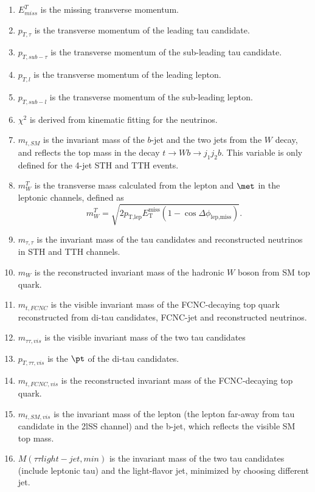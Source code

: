 \begin{enumerate}

\item $E^{T}_{miss}$ is the missing transverse momentum.
\item $p_{T,\tau}$ is the transverse momentum of the leading tau candidate.
\item $p_{T,sub-\tau}$ is the transverse momentum of the sub-leading tau candidate.
\item $p_{T,l}$ is the transverse momentum of the leading lepton.
\item $p_{T,sub-l}$ is the transverse momentum of the sub-leading lepton.
\item $\chi^2$ is derived from kinematic fitting for the neutrinos.
\item $m_{t,SM}$ is the invariant mass of the $b$-jet and the two jets from the $W$ decay, and reflects the top mass in the decay $t\to Wb \to j_1j_2b$. This variable is only defined for the 4-jet STH and TTH events.
\item $m^{T}_{W}$ is the transverse mass calculated from the lepton and $\met$ in the leptonic channels, defined as
\begin{equation}
m^{T}_{W} = \sqrt{2 p_{\text{T,lep}} E_{\text{T}}^{\text{miss}} \left(1-\cos\Delta\phi_{\text{lep,miss}} \right)}.  
\end{equation}
\item $m_{\tau,\tau}$ is the invariant mass of the tau candidates and reconstructed neutrinos in STH and TTH channels. 
\item $m_{W}$ is the reconstructed invariant mass of the hadronic $W$ boson from SM top quark.
\item $m_{t,FCNC}$ is the visible invariant mass of the FCNC-decaying top quark reconstructed from di-tau candidates, FCNC-jet and reconstructed neutrinos.
\item $m_{\tau\tau,vis}$ is the visible invariant mass of the two tau candidates
\item $p_{T,\tau\tau,vis}$ is the $\pt$ of the di-tau candidates.
\item $m_{t,FCNC,vis}$ is the reconstructed invariant mass of the FCNC-decaying top quark.
\item $m_{t,SM,vis}$ is the invariant mass of the lepton (the lepton far-away from tau candidate in the 2lSS channel) and the b-jet, which reflects the visible SM top mass.
\item $M(\tau\tau light-jet,min)$ is the invariant mass of the two tau candidates (include leptonic tau) and the light-flavor jet, minimized by choosing different jet.

\end{enumerate}
